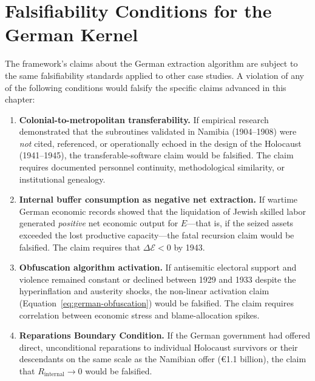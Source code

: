 \section{Falsifiability Conditions for the German Kernel}
\label{sec:german_falsifiability}

The framework's claims about the German extraction algorithm are subject to the same falsifiability standards applied to other case studies. A violation of any of the following conditions would falsify the specific claims advanced in this chapter:

\begin{enumerate}
    \item \textbf{Colonial-to-metropolitan transferability.} If empirical research demonstrated that the subroutines validated in Namibia (1904--1908) were \textit{not} cited, referenced, or operationally echoed in the design of the Holocaust (1941--1945), the transferable-software claim would be falsified. The claim requires documented personnel continuity, methodological similarity, or institutional genealogy.

    \item \textbf{Internal buffer consumption as negative net extraction.} If wartime German economic records showed that the liquidation of Jewish skilled labor generated \textit{positive} net economic output for $E$---that is, if the seized assets exceeded the lost productive capacity---the fatal recursion claim would be falsified. The claim requires that $\Delta \mathcal{E} < 0$ by 1943.

    \item \textbf{Obfuscation algorithm activation.} If antisemitic electoral support and violence remained constant or declined between 1929 and 1933 despite the hyperinflation and austerity shocks, the non-linear activation claim (Equation~\ref{eq:german-obfuscation}) would be falsified. The claim requires correlation between economic stress and blame-allocation spikes.

    \item \textbf{Reparations Boundary Condition.} If the German government had offered direct, unconditional reparations to individual Holocaust survivors or their descendants on the same scale as the Namibian offer (€1.1 billion), the claim that $R_{\text{internal}} \rightarrow 0$ would be falsified.
\end{enumerate}

